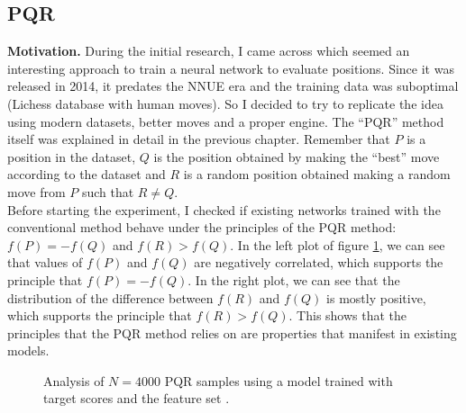 \newpage
\subsection{PQR}

\textbf{Motivation.} During the initial research, I came across \cite{dlchess:2014} which seemed an interesting approach to train a neural network to evaluate positions. Since it was released in 2014, it predates the NNUE era and the training data was suboptimal (Lichess database \cite{lichessdb} with human moves). So I decided to try to replicate the idea using modern datasets, better moves and a proper engine. The \enquote{PQR} method itself was explained in detail in the previous chapter.  Remember that $P$ is a position in the dataset, $Q$ is the position obtained by making the \enquote{best} move according to the dataset and $R$ is a random position obtained making a random move from $P$ such that $R \neq Q$. \\

Before starting the experiment, I checked if existing networks trained with the conventional method behave under the principles of the PQR method: ${f(P) = -f(Q)}$ and ${f(R) > f(Q)}$. In the left plot of figure \ref{pqr-eval}, we can see that values of $f(P)$ and $f(Q)$ are negatively correlated, which supports the principle that $f(P)=-f(Q)$. In the right plot, we can see that the distribution of the difference between $f(R)$ and $f(Q)$ is mostly positive, which supports the principle that $f(R) > f(Q)$. This shows that the principles that the PQR method relies on are properties that manifest in existing models.

\begin{figure}[H]
\centering
{}
\caption{Analysis of $N=4000$ PQR samples using a model trained with target scores and the feature set .}
\label{pqr-eval}
\end{figure}

